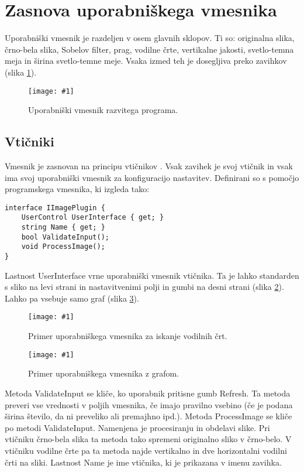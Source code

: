 \documentclass[oneside, a4paper, 12pt]{book}
\newcommand{\slika}[3]{
	\begin{figure}
	\begin{center}
	\texttt{[image: \#1]}
	\end{center}
	\vspace{-20pt}
	\caption{#2}
	\label{#3}
	\end{figure}
}
\begin{document}
\section{Zasnova uporabniškega vmesnika}
Uporabniški vmesnik je razdeljen v osem glavnih sklopov. Ti so: originalna slika, črno-bela slika, Sobelov filter, prag, vodilne črte, vertikalne jakosti, svetlo-temna meja in širina svetlo-temne meje. Vsaka izmed teh je dosegljiva preko zavihkov (slika \ref{pic:vmesnik1}).

\slika{slike/vmesnik-glavni.jpg}{Uporabniški vmesnik razvitega programa.}{pic:vmesnik1}

\subsection{Vtičniki}
Vmesnik je zasnovan na principu vtičnikov \cite{oreilly-dp, oreilly-cs}. Vsak zavihek je svoj vtičnik in vsak ima svoj uporabniški vmesnik za konfiguracijo nastavitev. Definirani so s pomočjo programskega vmesnika, ki izgleda tako:

\begin{samepage}
\begin{verbatim}
interface IImagePlugin {
    UserControl UserInterface { get; }
    string Name { get; }
    bool ValidateInput();
    void ProcessImage();
}
\end{verbatim}
\end{samepage}
Lastnost UserInterface vrne uporabniški vmesnik vtičnika. Ta je lahko standarden s sliko na levi strani in nastavitvenimi polji in gumbi na desni strani (slika \ref{pic:vmesnik2}). Lahko pa vsebuje samo graf (slika \ref{pic:vmesnik3}).

\slika{slike/vmesnik-slika-konfiguracija.jpg}{Primer uporabniškega vmesnika za iskanje vodilnih črt.}{pic:vmesnik2}

\slika{slike/vmesnik-samo-graf.jpg}{Primer uporabniškega vmesnika z grafom.}{pic:vmesnik3}

Metoda ValidateInput se kliče, ko uporabnik pritisne gumb Refresh. Ta metoda preveri vse vrednosti v poljih vmesnika, če imajo pravilno vsebino (če je podana širina število, da ni preveliko ali premajhno ipd.). Metoda ProcessImage se kliče po metodi ValidateInput. Namenjena je procesiranju in obdelavi slike. Pri vtičniku črno-bela slika ta metoda tako spremeni originalno sliko v črno-belo. V vtičniku vodilne črte pa ta metoda najde vertikalno in dve horizontalni vodilni črti na sliki. Lastnost Name je ime vtičnika, ki je prikazana v imenu zavihka.
\end{document}
